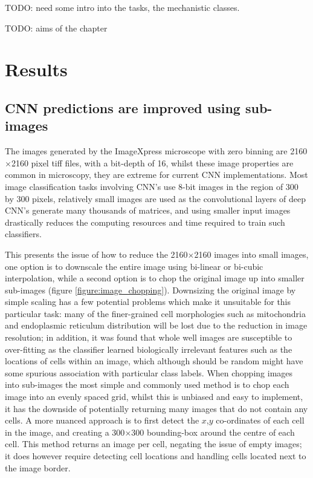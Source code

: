 \documentclass[a4paper,11pt,twoside,openright]{scrbook}
\begin{document}
TODO: need some intro into the tasks, the mechanistic classes.

TODO: aims of the chapter

\section{Results}

\subsection{CNN predictions are improved using sub-images}

The images generated by the ImageXpress microscope with zero binning are 2160$\times$2160 pixel tiff files, with a bit-depth of 16, whilst these image properties are common in microscopy, they are extreme for current CNN implementations.
Most image classification tasks involving CNN's use 8-bit images in the region of 300 by 300 pixels, relatively small images are used as the convolutional layers of deep CNN's generate many thousands of matrices, and using smaller input images drastically reduces the computing resources and time required to train such classifiers.

This presents the issue of how to reduce the 2160$\times$2160 images into small images, one option is to downscale the entire image using bi-linear or bi-cubic interpolation, while a second option is to chop the original image up into smaller sub-images (figure \ref{figure:image_chopping}).
Downsizing the original image by simple scaling has a few potential problems which make it unsuitable for this particular task:
    many of the finer-grained cell morphologies such as mitochondria and endoplasmic reticulum distribution will be lost due to the reduction in image resolution;
    in addition, it was found that whole well images are susceptible to over-fitting as the classifier learned biologically irrelevant features such as the locations of cells within an image, which although should be random might have some spurious association with particular class labels.
When chopping images into sub-images the most simple and commonly used method is to chop each image into an evenly spaced grid, whilst this is unbiased and easy to implement, it has the downside of potentially returning many images that do not contain any cells.
A more nuanced approach is to first detect the $x$,$y$ co-ordinates of each cell in the image, and creating a 300$\times$300 bounding-box around the centre of each cell.
This method returns an image per cell, negating the issue of empty images; it does however require detecting cell locations and handling cells located next to the image border.
\end{document}
